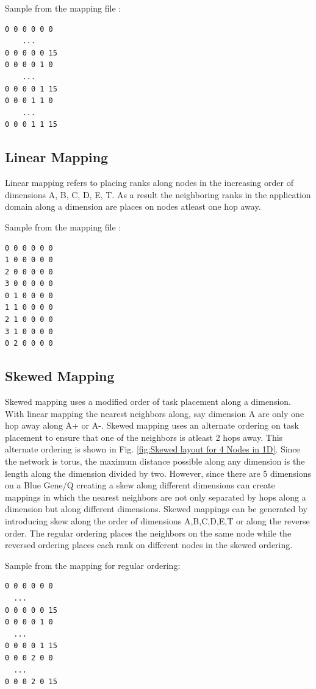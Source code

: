 \documentclass{acm_proc_article-sp}
\begin{document}
Sample from the mapping file :
\begin{lstlisting}[frame=lines, basicstyle=\ttfamily,columns=fixed]
0 0 0 0 0 0
    ...
0 0 0 0 0 15
0 0 0 0 1 0
    ...
0 0 0 0 1 15
0 0 0 1 1 0
    ...
0 0 0 1 1 15
\end{lstlisting}

\subsection{Linear Mapping}
Linear mapping refers to placing ranks along nodes in the increasing order of dimensions A, B, C, D, E, T.
As a result the neighboring ranks in the application domain along a dimension are places on nodes atleast
one hop away.

Sample from the mapping file :
\begin{lstlisting}[frame=lines, basicstyle=\ttfamily,columns=fixed]
0 0 0 0 0 0
1 0 0 0 0 0
2 0 0 0 0 0
3 0 0 0 0 0
0 1 0 0 0 0
1 1 0 0 0 0
2 1 0 0 0 0
3 1 0 0 0 0
0 2 0 0 0 0
\end{lstlisting}

\subsection{Skewed Mapping}

Skewed mapping uses a modified order of task placement along a dimension.
With linear mapping the nearest neighbors along, say dimension A are only one hop away along A+ or A-.
Skewed mapping uses an alternate ordering on task placement to ensure that one of the neighbors is atleast
2 hops away. This alternate ordering is shown in Fig. \ref{fig:Skewed layout for 4 Nodes in 1D}.
Since the network is torus, the maximum distance possible along any dimension is the length along
the dimension divided by two. However, since there are 5 dimensions on a Blue Gene/Q creating a skew along different
dimensions can create mappings in which the nearest neighbors are not only separated by hops along a dimension but
along different dimensions. Skewed mappings can be generated by introducing skew along the order of dimensions
A,B,C,D,E,T or along the reverse order. The regular ordering places the neighbors on the same node while the reversed
ordering places each rank on different nodes in the skewed ordering.

Sample from the mapping for regular ordering:
\begin{lstlisting}[frame=lines, basicstyle=\ttfamily,columns=fixed]
0 0 0 0 0 0
  ...
0 0 0 0 0 15
0 0 0 0 1 0
  ...
0 0 0 0 1 15
0 0 0 2 0 0
  ...
0 0 0 2 0 15
\end{lstlisting}
\end{document}
